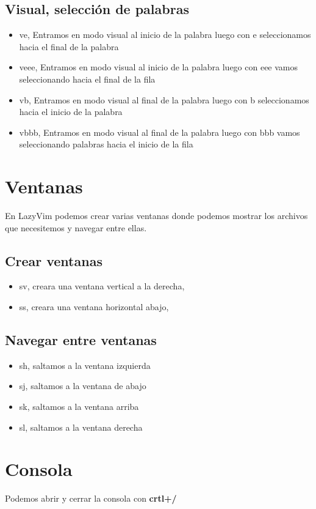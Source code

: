 \subsection{Visual, selección de palabras}
\begin{itemize}
  \item ve, Entramos en modo visual al inicio de la palabra luego con e seleccionamos hacia el final de la palabra
  \item veee, Entramos en modo visual al inicio de la palabra luego con eee vamos seleccionando hacia el final de la fila
  \item vb, Entramos en modo visual al final de la palabra luego con b seleccionamos hacia el inicio de la palabra
  \item vbbb, Entramos en modo visual al final de la palabra luego con bbb vamos seleccionando palabras hacia el inicio de la fila
\end{itemize}
\section{Ventanas}
En LazyVim podemos crear varias ventanas donde podemos mostrar los archivos que necesitemos y navegar entre ellas.
\subsection{Crear ventanas}
\begin{itemize}
  \item sv, creara una ventana vertical a la derecha,
  \item ss, creara una ventana horizontal abajo,
\end{itemize}
\subsection{Navegar entre ventanas}
\begin{itemize}
  \item sh, saltamos a la ventana izquierda 
  \item sj, saltamos a la ventana de abajo
  \item sk, saltamos a la ventana arriba
  \item sl, saltamos a la ventana derecha
\end{itemize}
\section{Consola}
Podemos abrir y cerrar la consola con \textbf{crtl+/}
